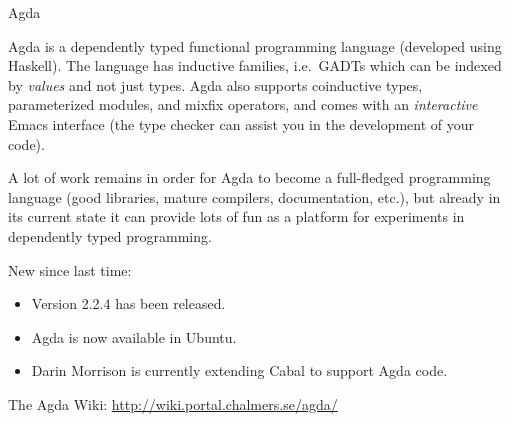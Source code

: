 \documentclass{article}
\begin{document}
\begin{hcarentry}[updated]{Agda}
\label{agda}
\makeheader

Agda is a dependently typed functional programming language (developed
using Haskell). The language has inductive families, i.e.\ GADTs which
can be indexed by \emph{values} and not just types. Agda also supports
coinductive types, parameterized modules, and mixfix operators, and
comes with an \emph{interactive} Emacs interface (the type checker can
assist you in the development of your code).

A lot of work remains in order for Agda to become a full-fledged
programming language (good libraries, mature compilers, documentation,
etc.), but already in its current state it can provide lots of fun as
a platform for experiments in dependently typed programming.

New since last time:
\begin{itemize}
\item Version 2.2.4 has been released.
\item Agda is now available in Ubuntu.
\item Darin Morrison is currently extending Cabal to support Agda
  code.
\end{itemize}

\FurtherReading
  The Agda Wiki: \url{http://wiki.portal.chalmers.se/agda/}
\end{hcarentry}
\end{document}
